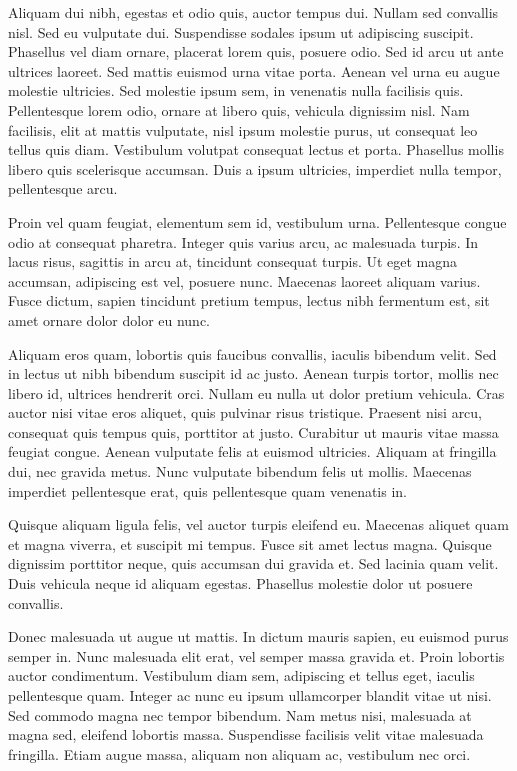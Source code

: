 \documentclass[journal]{IEEEtran}
\begin{document}
Aliquam dui nibh, egestas et odio quis, auctor tempus dui. Nullam sed convallis nisl. Sed eu vulputate dui. Suspendisse sodales ipsum ut adipiscing suscipit. Phasellus vel diam ornare, placerat lorem quis, posuere odio. Sed id arcu ut ante ultrices laoreet. Sed mattis euismod urna vitae porta. Aenean vel urna eu augue molestie ultricies. Sed molestie ipsum sem, in venenatis nulla facilisis quis. Pellentesque lorem odio, ornare at libero quis, vehicula dignissim nisl. Nam facilisis, elit at mattis vulputate, nisl ipsum molestie purus, ut consequat leo tellus quis diam. Vestibulum volutpat consequat lectus et porta. Phasellus mollis libero quis scelerisque accumsan. Duis a ipsum ultricies, imperdiet nulla tempor, pellentesque arcu.

Proin vel quam feugiat, elementum sem id, vestibulum urna. Pellentesque congue odio at consequat pharetra. Integer quis varius arcu, ac malesuada turpis. In lacus risus, sagittis in arcu at, tincidunt consequat turpis. Ut eget magna accumsan, adipiscing est vel, posuere nunc. Maecenas laoreet aliquam varius. Fusce dictum, sapien tincidunt pretium tempus, lectus nibh fermentum est, sit amet ornare dolor dolor eu nunc.

Aliquam eros quam, lobortis quis faucibus convallis, iaculis bibendum velit. Sed in lectus ut nibh bibendum suscipit id ac justo. Aenean turpis tortor, mollis nec libero id, ultrices hendrerit orci. Nullam eu nulla ut dolor pretium vehicula. Cras auctor nisi vitae eros aliquet, quis pulvinar risus tristique. Praesent nisi arcu, consequat quis tempus quis, porttitor at justo. Curabitur ut mauris vitae massa feugiat congue. Aenean vulputate felis at euismod ultricies. Aliquam at fringilla dui, nec gravida metus. Nunc vulputate bibendum felis ut mollis. Maecenas imperdiet pellentesque erat, quis pellentesque quam venenatis in.

Quisque aliquam ligula felis, vel auctor turpis eleifend eu. Maecenas aliquet quam et magna viverra, et suscipit mi tempus. Fusce sit amet lectus magna. Quisque dignissim porttitor neque, quis accumsan dui gravida et. Sed lacinia quam velit. Duis vehicula neque id aliquam egestas. Phasellus molestie dolor ut posuere convallis.

Donec malesuada ut augue ut mattis. In dictum mauris sapien, eu euismod purus semper in. Nunc malesuada elit erat, vel semper massa gravida et. Proin lobortis auctor condimentum. Vestibulum diam sem, adipiscing et tellus eget, iaculis pellentesque quam. Integer ac nunc eu ipsum ullamcorper blandit vitae ut nisi. Sed commodo magna nec tempor bibendum. Nam metus nisi, malesuada at magna sed, eleifend lobortis massa. Suspendisse facilisis velit vitae malesuada fringilla. Etiam augue massa, aliquam non aliquam ac, vestibulum nec orci.
\end{document}
